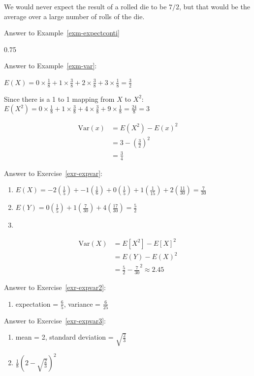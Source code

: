 \documentclass[
  letterpaper,
]{book}
\providecommand{\tightlist}{%
  \setlength{\itemsep}{0pt}\setlength{\parskip}{0pt}}\usepackage{longtable,booktabs,array}
\theoremstyle{definition}
\theoremstyle{definition}
\theoremstyle{plain}
\theoremstyle{definition}
\theoremstyle{plain}
\theoremstyle{plain}
\theoremstyle{remark}
\begin{document}
We would never expect the result of a rolled die to be \(7/2\), but that
would be the average over a large number of rolls of the die.

Answer to Example~\ref{exm-expectconti}

0.75

Answer to Example~\ref{exm-var}:

\(E(X) = 0 \times \frac{1}{8} + 1 \times \frac{3}{8} + 2 \times \frac{3}{8} + 3 \times \frac{1}{8} = \frac{3}{2}\)

Since there is a 1 to 1 mapping from \(X\) to \(X^2:\)
\(E(X^2) = 0 \times \frac{1}{8} + 1 \times \frac{3}{8} + 4 \times \frac{3}{8} + 9 \times \frac{1}{8} = \frac{24}{8} = 3\)

\begin{align*}
\text{Var}(x) &= E(X^2) - E(x)^2\\
&= 3 - (\frac{3}{2})^2\\
&= \frac{3}{4}
\end{align*}

Answer to Exercise~\ref{exr-expvar}:

\begin{enumerate}
\def\labelenumi{\arabic{enumi}.}
\item
  \(E(X) = -2(\frac{1}{5}) + -1(\frac{1}{6}) + 0(\frac{1}{5}) + 1(\frac{1}{15}) + 2(\frac{11}{30}) = \frac{7}{30}\)
\item
  \(E(Y) = 0(\frac{1}{5}) + 1(\frac{7}{30}) + 4(\frac{17}{30}) = \frac{5}{2}\)
\item
\end{enumerate}

\begin{align*}
\text{Var}(X) &= E[X^2] - E[X]^2\\
&= E(Y) - E(X)^2\\
&= \frac{5}{2} - \frac{7}{30}^2 \approx 2.45
\end{align*}

Answer to Exercise~\ref{exr-expvar2}:

\begin{enumerate}
\def\labelenumi{\arabic{enumi}.}
\tightlist
\item
  expectation = \(\frac{6}{5}\), variance = \(\frac{6}{25}\)
\end{enumerate}

Answer to Exercise~\ref{exr-expvar3}:

\begin{enumerate}
\def\labelenumi{\arabic{enumi}.}
\item
  mean = 2, standard deviation = \(\sqrt{\frac{2}{3}}\)
\item
  \(\frac{1}{8}(2 - \sqrt{\frac{2}{3}})^2\)
\end{enumerate}
\end{document}
